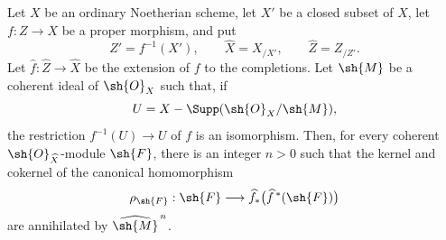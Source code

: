 \begin{lemma}[5.3.4]
\label{III.5.3.4}
Let $X$ be an ordinary Noetherian scheme, let $X'$ be a closed
subset of $X$, let $f:Z\to X$ be a proper morphism, and put
\[
  Z'=f^{-1}(X'),\qquad
  \widehat{X}=X_{/X'},\qquad
  \widehat{Z}=Z_{/Z'}.
\]
Let $\widehat{f}:\widehat{Z}\to\widehat{X}$ be the extension of $f$
to the completions.  Let $\sh{M}$ be a coherent ideal of
$\sh{O}_X$ such that, if
\[
  U=X-\Supp(\sh{O}_X/\sh{M}),
\]
the restriction $f^{-1}(U)\to U$ of $f$ is an isomorphism.  Then,
for every coherent $\sh{O}_{\widehat{X}}$-module $\sh{F}$, there is
an integer $n>0$ such that the kernel and cokernel of the canonical
homomorphism
\[
  \rho_{\sh{F}}:
  \sh{F}\longrightarrow
  \widehat{f}_*\bigl(\widehat{f}^{\,*}(\sh{F})\bigr)
\]
 are annihilated by
$\widehat{\sh{M}}^{\,n}$.
\end{lemma}

